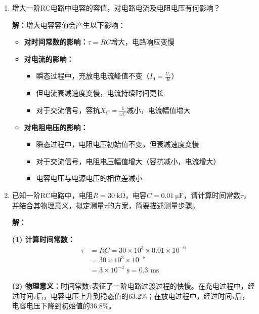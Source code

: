 \documentclass[12pt,a4paper]{article}
\begin{document}
\begin{enumerate}
    \item 增大一阶RC电路中电容的容值，对电路电流及电阻电压有何影响？
    
    \textbf{解：}增大电容容值会产生以下影响：
    \begin{itemize}
        \item \textbf{对时间常数的影响：}$\tau = RC$增大，电路响应变慢
        \item \textbf{对电流的影响：}
        \begin{itemize}
            \item 瞬态过程中，充放电电流峰值不变（$I_0 = \frac{U_s}{R}$）
            \item 但电流衰减速度变慢，电流持续时间更长
            \item 对于交流信号，容抗$X_C = \frac{1}{\omega C}$减小，电流幅值增大
        \end{itemize}
        \item \textbf{对电阻电压的影响：}
        \begin{itemize}
            \item 瞬态过程中，电阻电压初始值不变，但衰减速度变慢
            \item 对于交流信号，电阻电压幅值增大（容抗减小，电流增大）
            \item 电容电压与电源电压的相位差减小
        \end{itemize}
    \end{itemize}
    \vspace{0.5cm}
    
    \item 已知一阶RC电路中，电阻$R = \SI{30}{\kilo\ohm}$，电容$C = \SI{0.01}{\micro\farad}$，请计算时间常数$\tau$，并结合其物理意义，拟定测量$\tau$的方案，简要描述测量步骤。
    
    \textbf{解：}
    
    \textbf{(1) 计算时间常数：}
    \begin{align*}
        \tau &= RC = 30 \times 10^3 \times 0.01 \times 10^{-6} \\
        &= 30 \times 10^3 \times 10^{-8} \\
        &= 3 \times 10^{-4} \text{ s} = 0.3 \text{ ms}
    \end{align*}
    
    \textbf{(2) 物理意义：}时间常数$\tau$表征了一阶电路过渡过程的快慢。在充电过程中，经过时间$\tau$后，电容电压上升到稳态值的63.2\%；在放电过程中，经过时间$\tau$后，电容电压下降到初始值的36.8\%。
    

\end{enumerate}
\end{document}
